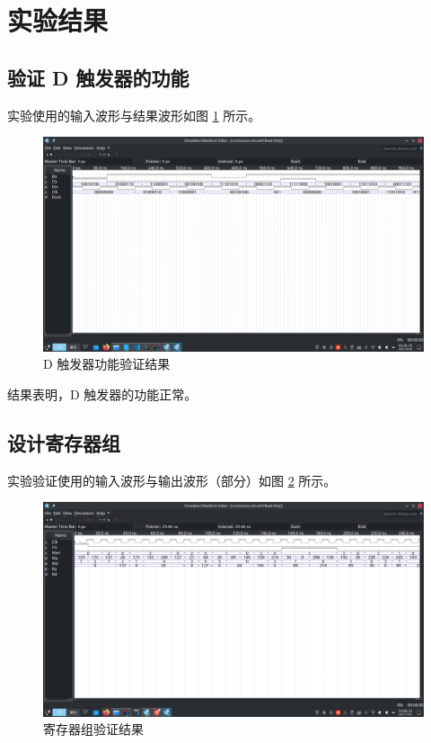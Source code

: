 \section{实验结果}

\subsection{验证 D 触发器的功能}

实验使用的输入波形与结果波形如图 \ref{figure:1.1-result} 所示。

\begin{figure}[h]
    \centering
    \caption{D 触发器功能验证结果}
    \label{figure:1.1-result}
    \includegraphics[scale=0.2]{pics/1.1-result.png}
\end{figure}

结果表明，D 触发器的功能正常。

\subsection{设计寄存器组}

实验验证使用的输入波形与输出波形（部分）如图 \ref{figure:1.2-result} 所示。

\begin{figure}[h]
    \centering
    \caption{寄存器组验证结果}
    \label{figure:1.2-result}
    \includegraphics[scale=0.2]{pics/1.2-result.png}
\end{figure}

